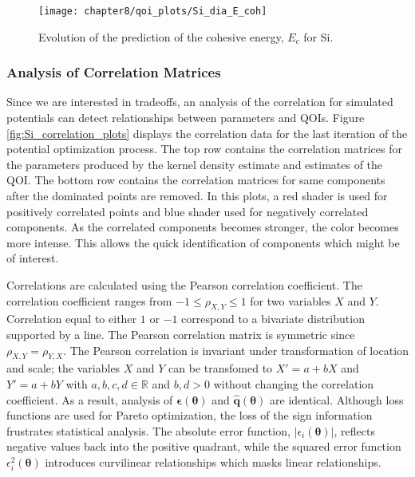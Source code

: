 \begin{figure}
	\centering
	\texttt{[image: chapter8/qoi\_plots/Si\_dia\_E\_coh]}
	\caption{Evolution of the prediction of the cohesive energy, $E_c$ for Si.}
	\label{fig:Si_qoi_E_coh}
\end{figure}

\subsubsection{Analysis of Correlation Matrices}

Since we are interested in tradeoffs, an analysis of the correlation for simulated potentials can detect relationships between parameters and QOIs.
Figure \ref{fig:Si_correlation_plots} displays the correlation data for the last iteration of the potential optimization process.
The top row contains the correlation matrices for the parameters produced by the kernel density estimate and estimates of the QOI.
The bottom row contains the correlation matrices for same components after the dominated points are removed.
In this plots, a red shader is used for positively correlated points and blue shader used for negatively correlated components.  As the correlated components becomes stronger, the color becomes more intense.  This allows the quick identification of components which might be of interest.

Correlations are calculated using the Pearson correlation coefficient.\cite{devore2012_probability}
The correlation coefficient ranges from $-1 \leq \rho_{X,Y} \leq 1$ for two variables $X$ and $Y$.  Correlation equal to either $1$ or $-1$ correspond to a bivariate distribution supported by a line.
The Pearson correlation matrix is symmetric since $\rho_{X,Y} = \rho_{Y,X}$.
The Pearson correlation is invariant under transformation of location and scale; the variables $X$  and $Y$ can be transfomed to $X'=a+bX$ and $Y'=a+bY$ with $a,b,c,d \in \mathbb{R}$ and $b,d > 0$ without changing the correlation coefficient.  As a result, analysis of $\bm{\epsilon}(\bm{\theta})$ and $\hat{\bm{q}}(\bm{\theta})$ are identical.
Although loss functions are used for Pareto optimization, the loss of the sign information frustrates statistical analysis.  The absolute error function, $|\epsilon_i(\bm{\theta})|$, reflects negative values back into the positive quadrant, while the squared error function $\epsilon_i^2(\bm{\theta})$ introduces curvilinear relationships which masks linear relationships.

